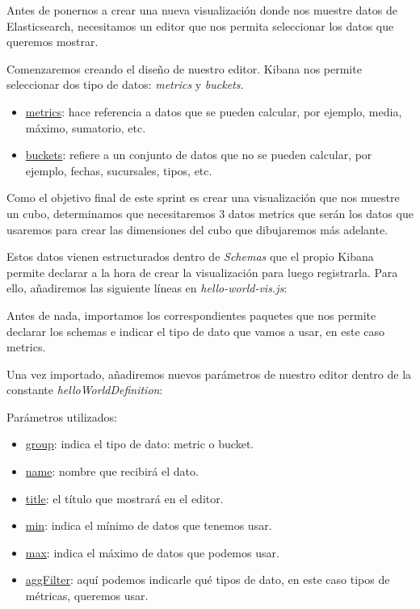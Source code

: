 \documentclass[a4paper, 12pt]{book}
\begin{document}
Antes de ponernos a crear una nueva visualización donde nos muestre datos de Elasticsearch, necesitamos un editor que nos permita seleccionar los datos que queremos mostrar. 

Comenzaremos creando el diseño de nuestro editor. Kibana nos permite seleccionar dos tipo de datos: \textit{metrics} y \textit{buckets}.
\begin{itemize}
    \item \underline{metrics}: hace referencia a datos que se pueden calcular, por ejemplo, media, máximo, sumatorio, etc.
    \item \underline{buckets}: refiere a un conjunto de datos que no se pueden calcular, por ejemplo, fechas, sucursales, tipos, etc.
\end{itemize}

Como el objetivo final de este sprint es crear una visualización que nos muestre un cubo, determinamos que necesitaremos 3 datos metrics que serán los datos que usaremos para crear las dimensiones del cubo que dibujaremos más adelante.

Estos datos vienen estructurados dentro de \textit{Schemas} que el propio Kibana permite declarar a la hora de crear la visualización para luego registrarla. Para ello, añadiremos las siguiente líneas en \textit{hello-world-vis.js}:

Antes de nada, importamos los correspondientes paquetes que nos permite declarar los schemas e indicar el tipo de dato que vamos a usar, en este caso metrics.





Una vez importado, añadiremos nuevos parámetros de nuestro editor dentro de la constante \textit{helloWorldDefinition}:




Parámetros utilizados:
\begin{itemize}
    \item \underline{group}: indica el tipo de dato: metric o bucket.
    \item \underline{name}: nombre que recibirá el dato.
    \item \underline{title}: el título que mostrará en el editor.
    \item \underline{min}: indica el mínimo de datos que tenemos usar.
    \item \underline{max}: indica el máximo de datos que podemos usar.
    \item \underline{aggFilter}: aquí podemos indicarle qué tipos de dato, en este caso tipos de métricas, queremos usar.
\end{itemize}
\end{document}
